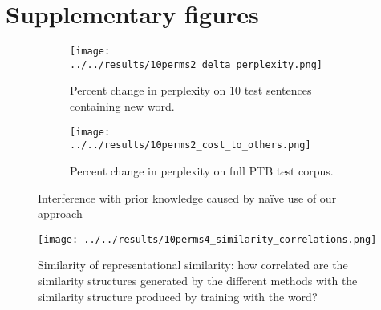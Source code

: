 \documentclass{article}
\begin{document}



\appendix
\section{Supplementary figures} \label{supp_fig_appdx}

\begin{figure}
\centering
\begin{subfigure}[b]{\textwidth}
\texttt{[image: ../../results/10perms2\_delta\_perplexity.png]}
\caption{Percent change in perplexity on 10 test sentences containing new word.}
\end{subfigure}
\begin{subfigure}[b]{\textwidth}
\texttt{[image: ../../results/10perms2\_cost\_to\_others.png]}
\caption{Percent change in perplexity on full PTB test corpus.}
\end{subfigure}
\caption{Interference with prior knowledge caused by na\"{i}ve use of our approach}
\label{interference_fig}
\end{figure}

\begin{figure}
\centering
\texttt{[image: ../../results/10perms4\_similarity\_correlations.png]}
\caption{Similarity of representational similarity: how correlated are the similarity structures generated by the different methods with the similarity structure produced by training with the word?}
\label{RSA_results}
\end{figure}
\end{document}
